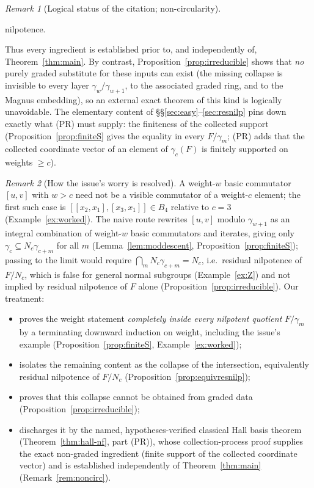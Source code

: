 \documentclass{amsart}
\theoremstyle{definition}
\theoremstyle{remark}
\newtheorem{remark}{Remark}
\begin{document}
\begin{remark}[Logical status of the citation; non-circularity]
\begin{itemize}
nilpotence.
\end{itemize}
Thus every ingredient is established prior to, and independently of,
Theorem~\ref{thm:main}. By contrast, Proposition~\ref{prop:irreducible} shows that
\emph{no} purely graded substitute for these inputs can exist (the missing collapse is
invisible to every layer $\gamma_w/\gamma_{w+1}$, to the associated graded ring, and to
the Magnus embedding), so an external exact theorem of this kind is logically
unavoidable. The elementary content of \S\S\ref{sec:easy}--\ref{sec:resnilp} pins down
exactly what (PR) must supply: the finiteness of the collected support
(Proposition~\ref{prop:finiteS} gives the equality in every $F/\gamma_m$; (PR) adds
that the collected coordinate vector of an element of $\gamma_c(F)$ is finitely
supported on weights $\ge c$).
\end{remark}


\begin{remark}[How the issue's worry is resolved]\label{rem:issue}
A weight-$w$ basic commutator $[u,v]$ with $w>c$ need not be a visible commutator of a
weight-$c$ element; the first such case is $[[x_2,x_1],[x_3,x_1]]\in B_4$ relative to
$c=3$ (Example~\ref{ex:worked}). The naive route rewrites $[u,v]$ modulo
$\gamma_{w+1}$ as an integral combination of weight-$w$ basic commutators and
iterates, giving only $\gamma_c\subseteq N_c\gamma_{c+m}$ for all $m$
(Lemma~\ref{lem:moddescent}, Proposition~\ref{prop:finiteS}); passing to the limit
would require $\bigcap_m N_c\gamma_{c+m}=N_c$, i.e.\ residual nilpotence of $F/N_c$,
which is false for general normal subgroups (Example~\ref{ex:Z}) and not implied by
residual nilpotence of $F$ alone (Proposition~\ref{prop:irreducible}). Our treatment:
\begin{itemize}
\item proves the weight statement \emph{completely inside every nilpotent quotient}
$F/\gamma_m$ by a terminating downward induction on weight, including the issue's
example (Proposition~\ref{prop:finiteS}, Example~\ref{ex:worked});
\item isolates the remaining content as the collapse of the intersection,
equivalently residual nilpotence of $F/N_c$ (Proposition~\ref{prop:equivresnilp});
\item proves that this collapse cannot be obtained from graded data
(Proposition~\ref{prop:irreducible});
\item discharges it by the named, hypotheses-verified classical Hall basis theorem
(Theorem~\ref{thm:hall-nf}, part (PR)), whose collection-process proof supplies the
exact non-graded ingredient (finite support of the collected coordinate vector) and is
established independently of Theorem~\ref{thm:main} (Remark~\ref{rem:noncirc}).
\end{itemize}
\end{remark}
\end{document}
